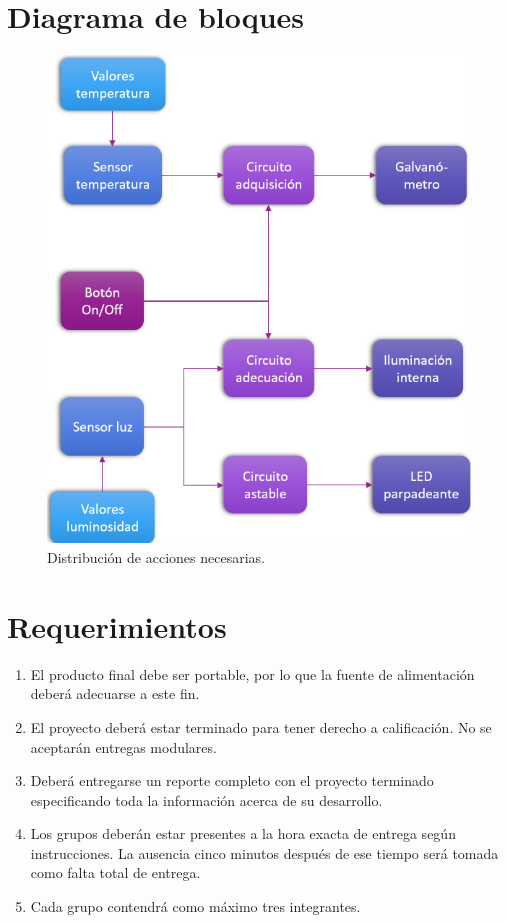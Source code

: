 \documentclass[letterpaper, 12 pt, conference]{ieeeconf}  %
\begin{document}
\section{Diagrama de bloques}
\begin{figure}[h!]
    \centering
    \includegraphics[scale=0.7]{db.png}
    \caption{Distribución de acciones necesarias.}
\end{figure}


\section{Requerimientos}
\begin{enumerate}
    \item El producto final debe ser portable, por lo que la fuente de alimentación deberá adecuarse a este fin.
    \item El proyecto deberá estar terminado para tener derecho a calificación. No se aceptarán entregas modulares.
    \item Deberá entregarse un reporte completo con el proyecto terminado especificando toda la información acerca de su desarrollo.
    \item Los grupos deberán estar presentes a la hora exacta de entrega según instrucciones. La ausencia cinco minutos después de ese tiempo será tomada como falta total de entrega.
    \item Cada grupo contendrá como máximo tres integrantes.
\end{enumerate}
\end{document}
